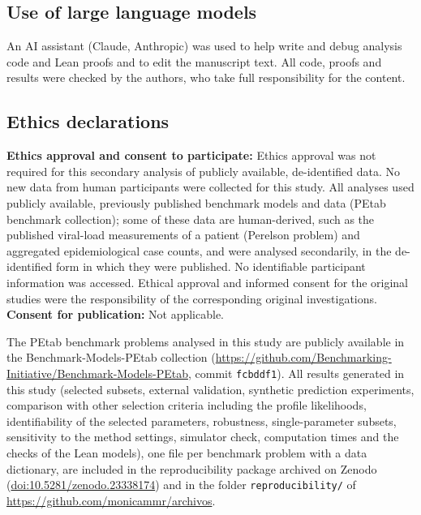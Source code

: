 \documentclass[pdflatex,sn-nature]{sn-jnl}
\theoremstyle{plain}
\newcommand{\zenododoi}{10.5281/zenodo.23338174}
\begin{document}
\subsection*{Use of large language models}

An AI assistant (Claude, Anthropic) was used to help write and debug analysis code and Lean proofs and to edit the manuscript text. All code, proofs and results were checked by the authors, who take full responsibility for the content.

\subsection*{Ethics declarations}
\textbf{Ethics approval and consent to participate:} Ethics approval was not required for this secondary analysis of publicly available, de-identified data. No new data from human participants were collected for this study. All analyses used publicly available, previously published benchmark models and data (PEtab benchmark collection); some of these data are human-derived, such as the published viral-load measurements of a patient (Perelson problem) and aggregated epidemiological case counts, and were analysed secondarily, in the de-identified form in which they were published. No identifiable participant information was accessed. Ethical approval and informed consent for the original studies were the responsibility of the corresponding original investigations.\\
\textbf{Consent for publication:} Not applicable.

\backmatter

The PEtab benchmark problems analysed in this study are publicly available in the Benchmark-Models-PEtab collection (\url{https://github.com/Benchmarking-Initiative/Benchmark-Models-PEtab}, commit \texttt{fcbddf1}). All results generated in this study (selected subsets, external validation, synthetic prediction experiments, comparison with other selection criteria including the profile likelihoods, identifiability of the selected parameters, robustness, single-parameter subsets, sensitivity to the method settings, simulator check, computation times and the checks of the Lean models), one file per benchmark problem with a data dictionary, are included in the reproducibility package archived on Zenodo (\href{https://doi.org/\zenododoi}{doi:\zenododoi}) and in the folder \texttt{reproducibility/} of \url{https://github.com/monicammr/archivos}.
\end{document}
